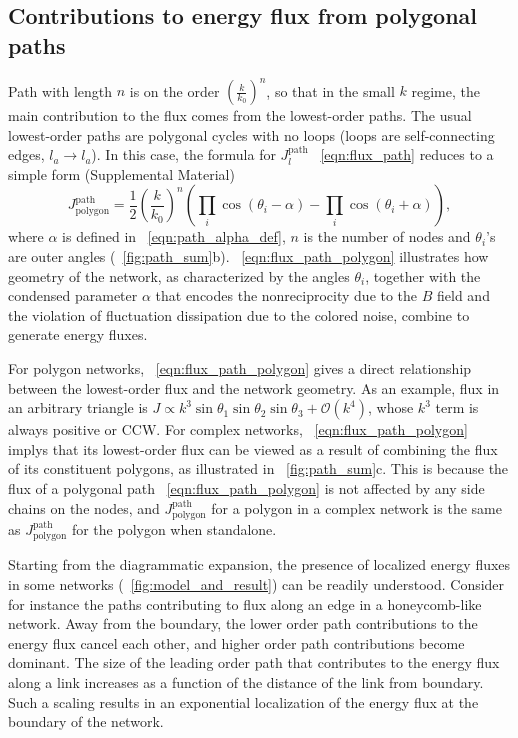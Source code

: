 \documentclass[
 preprint,
 preprintnumbers,
 amsmath,amssymb,
 aps,
 pre,
 longbibliography,
 superscriptaddress,
 10pt, twocolumn
]{revtex4-1}
\begin{document}
\subsection{Contributions to energy flux from polygonal paths}
Path with length $n$ is on the order $(\frac{k}{k_0})^n$, so that in the small $k$ regime, the main contribution to the flux comes from the lowest-order paths.
The usual lowest-order paths are polygonal cycles with no loops (loops are self-connecting edges, $l_a\rightarrow l_a$). In this case, the formula for $J^\text{path}_l$ \eqnname~\eqref{eqn:flux_path} reduces to a simple form (Supplemental Material)
\begin{equation} \label{eqn:flux_path_polygon}
    J^\text{path}_\text{polygon} = \frac{1}{2} (\frac{k}{k_0})^n (\prod_i \cos(\theta_i - \alpha) - \prod_i \cos(\theta_i + \alpha)),
\end{equation}
where $\alpha$ is defined in \eqnname~\eqref{eqn:path_alpha_def}, $n$ is the number of nodes and $\theta_i$'s are outer angles (\figurename~\ref{fig:path_sum}b).
\eqnname~\ref{eqn:flux_path_polygon} illustrates how geometry of the network, as characterized by the angles $\theta_i$, together with the condensed parameter $\alpha$ that encodes the nonreciprocity due to the $B$ field and the violation of fluctuation dissipation due to the colored noise, combine to generate energy fluxes.

For polygon networks, \eqnname~\eqref{eqn:flux_path_polygon} gives a direct relationship between the lowest-order flux and the network geometry. As an example, flux in an arbitrary triangle is $J \propto k^3 \sin\theta_1\sin\theta_2\sin\theta_3 + \mathcal{O}(k^4)$, whose $k^3$ term is always positive or CCW.
For complex networks, \eqnname~\eqref{eqn:flux_path_polygon} implys that its lowest-order flux can be viewed as a result of combining the flux of its constituent polygons, as illustrated in \figurename~\ref{fig:path_sum}c. This is because the flux of a polygonal path \eqnname~\eqref{eqn:flux_path_polygon} is not affected by any side chains on the nodes, and $J^\text{path}_\text{polygon}$ for a polygon in a complex network is the same as $J^\text{path}_\text{polygon}$ for the polygon when standalone.

Starting from the  diagrammatic expansion, the presence of localized energy fluxes in some networks (\figurename~\ref{fig:model_and_result}) can be readily understood. Consider for instance the paths contributing to flux along an edge in a honeycomb-like network. Away from the boundary, the lower order path contributions to the energy flux cancel each other, and higher order path contributions become dominant. The size of the leading order path that contributes to the energy flux along a link increases as a function of the distance of the link from boundary. Such a scaling results in an exponential localization of the energy flux at the boundary of the network.
\end{document}
